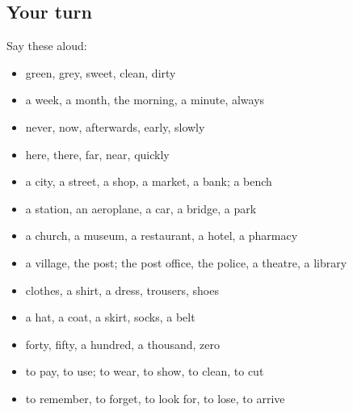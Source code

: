 \subsection*{Your turn}
Say these aloud:

\begin{itemize}
\raggedright
  \item green, grey, sweet, clean, dirty
  \item a week, a month, the morning, a minute, always
  \item never, now, afterwards, early, slowly
  \item here, there, far, near, quickly
  \item a city, a street, a shop, a market, a bank; a bench
  \item a station, an aeroplane, a car, a bridge, a park
  \item a church, a museum, a restaurant, a hotel, a pharmacy
  \item a village, the post; the post office, the police, a theatre, a library
  \item clothes, a shirt, a dress, trousers, shoes
  \item a hat, a coat, a skirt, socks, a belt
  \item forty, fifty, a hundred, a thousand, zero
  \item to pay, to use; to wear, to show, to clean, to cut
  \item to remember, to forget, to look for, to lose, to arrive
\end{itemize}

